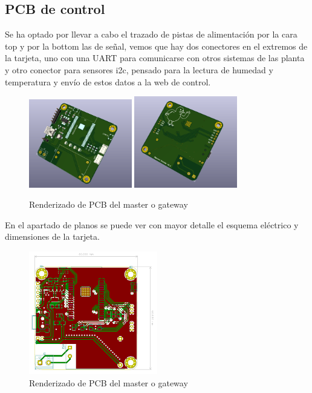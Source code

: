 \documentclass[a4paper ,12pt, onecolumn]{article}
\begin{document}
    \subsection{PCB de control}
        Se ha optado por llevar a cabo el trazado de pistas de alimentación por la cara top y por la bottom las de señal, vemos que hay dos 
        conectores en el extremos de la tarjeta, uno con una UART para comunicarse con otros sistemas de las planta y otro conector para sensores
        i2c, pensado para la lectura de humedad y temperatura y envío de estos datos a la web de control.
        \begin{center}
            \begin{figure}[ht]
                \centering
                \includegraphics[width=0.4\textwidth]{../receiver_1.PNG}
                \includegraphics[width=0.4\textwidth]{../receiver_2.PNG}
                \caption{Renderizado de PCB del master o gateway}
                \label{fig:mesh5}
            \end{figure}    
        \end{center}
        En el apartado de planos se puede ver con mayor detalle el esquema eléctrico y dimensiones de la tarjeta.
        \begin{center}
            \begin{figure}[ht]
                \centering
                \includegraphics[width=0.5\textwidth]{../receiver_PCB.PNG}
                \caption{Renderizado de PCB del master o gateway}
                \label{fig:mesh6}
            \end{figure}    
        \end{center}
\end{document}
